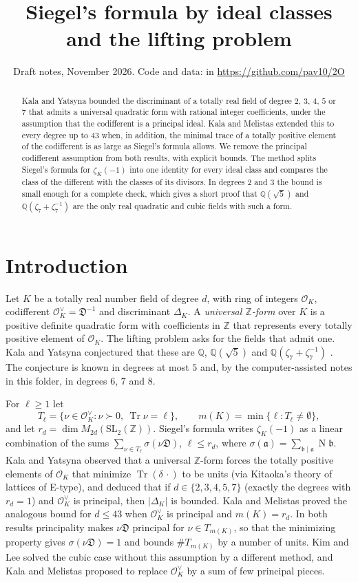 \documentclass[11pt]{amsart}
\title{Siegel's formula by ideal classes and the lifting problem}
\date{Draft notes, November 2026. Code and data: \file{higher-degree/} in \url{https://github.com/pav10/2O}}
\theoremstyle{definition}
\numberwithin{equation}{section}
\DeclareMathOperator{\Tr}{Tr}
\DeclareMathOperator{\N}{N}
\newcommand{\OK}{\mathcal{O}_K}
\newcommand{\OKd}{\mathcal{O}_K^{\vee}}
\newcommand{\Dif}{\mathfrak{D}}
\newcommand{\Q}{\mathbb{Q}}
\newcommand{\Z}{\mathbb{Z}}
\begin{document}
\begin{abstract}
Kala and Yatsyna bounded the discriminant of a totally real field of degree $2$, $3$, $4$, $5$ or $7$
that admits a universal quadratic form with rational integer coefficients, under the assumption
that the codifferent is a principal ideal.  Kala and Melistas extended this to every degree up to $43$
when, in addition, the minimal trace of a totally positive element of the codifferent is as large as
Siegel's formula allows.  We remove the principal codifferent assumption from both results, with
explicit bounds.  The method splits Siegel's formula for $\zeta_K(-1)$ into one identity for every
ideal class and compares the class of the different with the classes of its divisors.  In degrees
$2$ and $3$ the bound is small enough for a complete check, which gives a short proof that
$\Q(\sqrt5)$ and $\Q(\zeta_7+\zeta_7^{-1})$ are the only real quadratic and cubic fields with such a
form.
\end{abstract}

\maketitle

\section{Introduction}

Let $K$ be a totally real number field of degree $d$, with ring of integers $\OK$, codifferent
$\OKd=\Dif^{-1}$ and discriminant $\Delta_K$.  A \emph{universal $\Z$-form} over $K$ is a positive
definite quadratic form with coefficients in $\Z$ that represents every totally positive element of
$\OK$.  The lifting problem asks for the fields that admit one.  Kala and Yatsyna conjectured that
these are $\Q$, $\Q(\sqrt5)$ and $\Q(\zeta_7+\zeta_7^{-1})$ \cite{KY1}.  The conjecture is known in
degrees at most $5$ \cite{KY2} and, by the computer-assisted notes in this folder, in degrees $6$,
$7$ and $8$.

For $\ell\ge1$ let
\[
  T_\ell=\{\nu\in\OKd : \nu\succ0,\ \Tr\nu=\ell\},\qquad m(K)=\min\{\ell : T_\ell\ne\emptyset\},
\]
and let $r_d=\dim M_{2d}(\mathrm{SL}_2(\Z))$.  Siegel's formula \cite{Si} writes $\zeta_K(-1)$ as a
linear combination of the sums $\sum_{\nu\in T_\ell}\sigma(\nu\Dif)$, $\ell\le r_d$, where
$\sigma(\mathfrak a)=\sum_{\mathfrak b\mid\mathfrak a}\N\mathfrak b$.  Kala and Yatsyna
\cite[Theorem~1.2]{KY1} observed that a universal $\Z$-form forces the totally positive elements of
$\OK$ that minimize $\Tr(\delta\,\cdot)$ to be units (via Kitaoka's theory of lattices of E-type), and
deduced that if $d\in\{2,3,4,5,7\}$ (exactly the degrees with $r_d=1$) and $\OKd$ is principal, then
$|\Delta_K|$ is bounded.  Kala and Melistas \cite[Theorem~2.4]{KM} proved the analogous bound for
$d\le43$ when $\OKd$ is principal and $m(K)=r_d$.  In both results principality makes $\nu\Dif$
principal for $\nu\in T_{m(K)}$, so that the minimizing property gives $\sigma(\nu\Dif)=1$ and bounds
$\#T_{m(K)}$ by a number of units.  Kim and Lee \cite{KL} solved the cubic case without this assumption by a
different method, and Kala and Melistas \cite[\S3]{KM} proposed to replace $\OKd$ by a sum of few
principal pieces.
\end{document}
